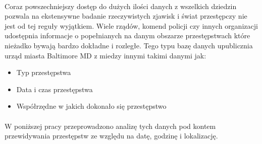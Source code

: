 \paragraph{}
Coraz powszechniejszy dostęp do dużych ilości danych z wszelkich dziedzin pozwala na ekstensywne badanie rzeczywistych zjawisk i świat przestępczy nie jest od tej reguły wyjątkiem. Wiele rządów, komend policji czy innych organizacji udostępnia informacje o popełnianych na danym obszarze przestępstwach które nieżadko bywają bardzo dokładne i rozległe. Tego typu bazę danych upublicznia urząd miasta Baltimore MD z miedzy innymi takimi danymi jak:
\begin{itemize}
  \item Typ przestępstwa
  \item Data i czas przestępstwa
  \item Współrzędne w jakich dokonało się przestępstwo
\end{itemize}
\paragraph{}
W poniższej pracy przeprowadzono analizę tych danych pod kontem przewidywania przestępstw ze względu na datę, godzinę i lokalizację.